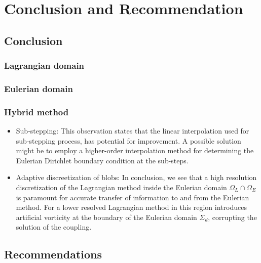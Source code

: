 \chapter{Conclusion and Recommendation}
\label{ch:ConclusionandRecommendation}

\section{Conclusion}

\subsection{Lagrangian domain}

\subsection{Eulerian domain}

\subsection{Hybrid method}

\begin{itemize}
\item Sub-stepping: This observation states that the linear interpolation used for sub-stepping process, has potential for improvement. A possible solution might be to employ a higher-order interpolation method for determining the Eulerian Dirichlet boundary condition at the sub-steps.

\item Adaptive discreetization of blobs: In conclusion, we see that a high resolution discretization of the Lagrangian method inside the Eulerian domain $\Omega_L \cap \Omega_E$ is paramount for accurate transfer of information to and from the Eulerian method. For a lower resolved Lagrangian method in this region introduces artificial vorticity at the boundary of the Eulerian domain $\Sigma_d$, corrupting the solution of the coupling.

\end{itemize}


\section{Recommendations}

